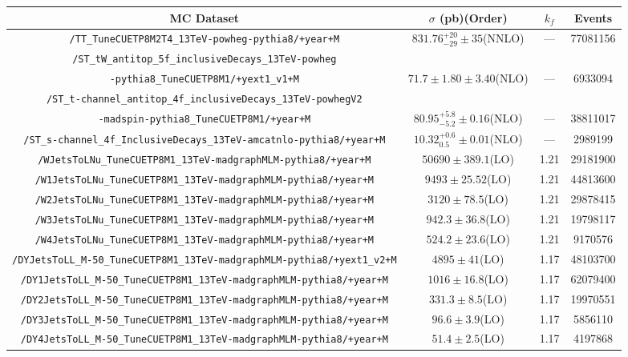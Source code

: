 
\begin{adjustbox}{max width=\textwidth}
\begin{tabular}{cccc} \hline\hline
    {\bf{MC Dataset}} & {\bf{$\sigma$}} (pb)(Order) &{\bf{$k_f$}}& {\bf{Events}}\\\hline\hline
    \verb|/TT_TuneCUETP8M2T4_13TeV-powheg-pythia8/+year+M|     
    &$831.76^{+20}_{-29} \pm 35$(NNLO) & --- & 77081156 \\ [0.1cm] 
    \verb|/ST_tW_antitop_5f_inclusiveDecays_13TeV-powheg| \\ 
    \verb|-pythia8_TuneCUETP8M1/+yext1_v1+M|  
    &$71.7 \pm 1.80 \pm 3.40$(NLO) & --- &  6933094   \\[0.1cm]
    \verb|/ST_t-channel_antitop_4f_inclusiveDecays_13TeV-powhegV2|\\
    \verb|-madspin-pythia8_TuneCUETP8M1/+year+M|  
    &$80.95^{+5.8}_{-5.2} \pm 0.16$(NLO) & ---  & 38811017  \\ [0.1cm]
    \verb|/ST_s-channel_4f_InclusiveDecays_13TeV-amcatnlo-pythia8/+year+M|  
    &$10.32^{+0.6}_{0.5} \pm 0.01$(NLO) & ---  & 2989199  \\[0.1cm] \hline
    
    \verb|/WJetsToLNu_TuneCUETP8M1_13TeV-madgraphMLM-pythia8/+year+M|       
    &$50690 \pm 389.1$(LO) & 1.21  & 29181900  \\[0.1cm]
    \verb|/W1JetsToLNu_TuneCUETP8M1_13TeV-madgraphMLM-pythia8/+year+M|   
    &$9493 \pm 25.52$(LO)      & 1.21  & 44813600  \\[0.1cm]
    \verb|/W2JetsToLNu_TuneCUETP8M1_13TeV-madgraphMLM-pythia8/+year+M|      
    &$3120 \pm 78.5$(LO)   & 1.21  & 29878415  \\[0.1cm]
    \verb|/W3JetsToLNu_TuneCUETP8M1_13TeV-madgraphMLM-pythia8/+year+M|      
    &$942.3 \pm 36.8$(LO)  & 1.21  & 19798117  \\[0.1cm]
    \verb|/W4JetsToLNu_TuneCUETP8M1_13TeV-madgraphMLM-pythia8/+year+M|      
    &$524.2 \pm 23.6$(LO)  & 1.21  & 9170576  \\[0.1cm]\hline

    \verb|/DYJetsToLL_M-50_TuneCUETP8M1_13TeV-madgraphMLM-pythia8/+yext1_v2+M| 
    &$4895 \pm 41$(LO)    & 1.17  & 48103700  \\[0.1cm]
    \verb|/DY1JetsToLL_M-50_TuneCUETP8M1_13TeV-madgraphMLM-pythia8/+year+M|
    &$1016 \pm 16.8$(LO)  & 1.17  & 62079400  \\[0.1cm]
    \verb|/DY2JetsToLL_M-50_TuneCUETP8M1_13TeV-madgraphMLM-pythia8/+year+M|     
    &$331.3\pm 8.5$(LO)   & 1.17  & 19970551  \\[0.1cm]
    \verb|/DY3JetsToLL_M-50_TuneCUETP8M1_13TeV-madgraphMLM-pythia8/+year+M|     
    &$96.6 \pm 3.9$(LO)   & 1.17  & 5856110  \\[0.1cm]
    \verb|/DY4JetsToLL_M-50_TuneCUETP8M1_13TeV-madgraphMLM-pythia8/+year+M|     
    &$51.4 \pm 2.5$(LO)   & 1.17  & 4197868  \\[0.1cm] \hline


\end{tabular}
\end{adjustbox}
